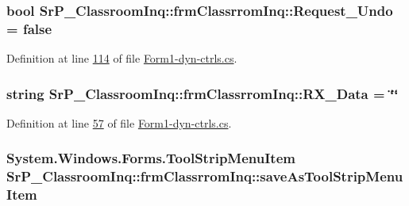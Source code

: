 \hypertarget{class_sr_p___classroom_inq_1_1frm_classrrom_inq_acb5bab8dcbcbfc8ed7a5b260ddba84e3}{
\subsubsection[{\-Request\-\_\-\-Undo}]{\setlength{\rightskip}{0pt plus 5cm}bool {\bf \-Sr\-P\-\_\-\-Classroom\-Inq\-::frm\-Classrrom\-Inq\-::\-Request\-\_\-\-Undo} = false}}
\label{class_sr_p___classroom_inq_1_1frm_classrrom_inq_acb5bab8dcbcbfc8ed7a5b260ddba84e3}


\-Definition at line \hyperlink{_form1-dyn-ctrls_8cs_source_l00114}{114} of file \hyperlink{_form1-dyn-ctrls_8cs_source}{\-Form1-\/dyn-\/ctrls.\-cs}.

\hypertarget{class_sr_p___classroom_inq_1_1frm_classrrom_inq_ab11c567168df8023b691c4adf4a149ad}{
\subsubsection[{\-R\-X\-\_\-\-Data}]{\setlength{\rightskip}{0pt plus 5cm}string {\bf \-Sr\-P\-\_\-\-Classroom\-Inq\-::frm\-Classrrom\-Inq\-::\-R\-X\-\_\-\-Data} = \char`\"{}\char`\"{}}}
\label{class_sr_p___classroom_inq_1_1frm_classrrom_inq_ab11c567168df8023b691c4adf4a149ad}


\-Definition at line \hyperlink{_form1-dyn-ctrls_8cs_source_l00057}{57} of file \hyperlink{_form1-dyn-ctrls_8cs_source}{\-Form1-\/dyn-\/ctrls.\-cs}.

\hypertarget{class_sr_p___classroom_inq_1_1frm_classrrom_inq_a660ffe654aa61a06b147d2220fc5c75d}{
\subsubsection[{save\-As\-Tool\-Strip\-Menu\-Item}]{\setlength{\rightskip}{0pt plus 5cm}\-System.\-Windows.\-Forms.\-Tool\-Strip\-Menu\-Item {\bf \-Sr\-P\-\_\-\-Classroom\-Inq\-::frm\-Classrrom\-Inq\-::save\-As\-Tool\-Strip\-Menu\-Item}}}
\label{class_sr_p___classroom_inq_1_1frm_classrrom_inq_a660ffe654aa61a06b147d2220fc5c75d}


